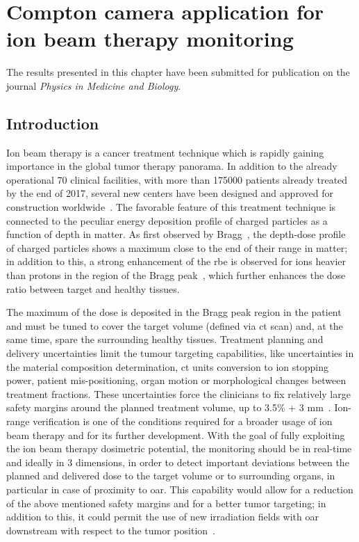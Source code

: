 \chapter{Compton camera application for ion beam therapy monitoring}\label{chap::4}

The results presented in this chapter have been submitted for publication on the journal \textit{Physics in Medicine and Biology}.

\vfill

\minitoc

\newpage

\glsresetall
{} 

\section{Introduction}\label{chap4::sec::Intro}
Ion beam therapy is a cancer treatment technique which is rapidly gaining importance in the global tumor therapy panorama. In addition to the already operational 70 clinical facilities, with more than 175000 patients already treated by the end of 2017, several new centers have been designed and approved for construction worldwide~\parencite{PTCOG2017}. The favorable feature of this treatment technique is connected to the peculiar energy deposition profile of charged particles as a function of depth in matter. As first observed by Bragg~\parencite{Bragg1904}, the depth-dose profile of charged particles shows a maximum close to the end of their range in matter; in addition to this, a strong enhancement of the \gls{rbe} is observed for ions heavier than protons in the region of the Bragg peak~\parencite{Elsasser2004, Weyrather1999}, which further enhances the dose ratio between target and healthy tissues.

The maximum of the dose is deposited in the Bragg peak region in the patient and must be tuned to cover the target volume (defined via \gls{ct} scan) and, at the same time, spare the surrounding healthy tissues. Treatment planning and delivery uncertainties limit the tumour targeting capabilities, like uncertainties in the material composition determination, \gls{ct} units conversion to ion stopping power, patient mis-positioning, organ motion or morphological changes between treatment fractions. These uncertainties force the clinicians to fix relatively large safety margins around the planned treatment volume, up to 3.5\% + 3 mm~\parencite{Paganetti2012}. Ion-range verification is one of the conditions required for a broader usage of ion beam therapy and for its further development. With the goal of fully exploiting the ion beam therapy dosimetric potential, the monitoring should be in real-time and ideally in 3 dimensions, in order to detect important deviations between the planned and delivered dose to the target volume or to surrounding organs, in particular in case of proximity to \gls{oar}. This capability would allow for a reduction of the above mentioned safety margins and for a better tumor targeting; in addition to this, it could permit the use of new irradiation fields with \gls{oar} downstream with respect to the tumor position~\parencite{Knopf2013}.   

